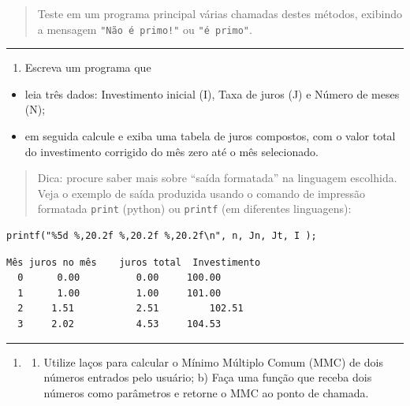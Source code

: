 \documentclass[12pt,a4paper]{article}
\renewcommand{\linethickness}{0.05em}
\providecommand{\tightlist}{%
      \setlength{\itemsep}{0pt}\setlength{\parskip}{0pt}}
\begin{document}
\begin{quote}
Teste em um programa principal várias chamadas destes métodos, exibindo
a mensagem \texttt{"Não\ é\ primo!"} ou \texttt{"é\ primo"}.
\end{quote}

    \begin{center}\rule{0.5\linewidth}{\linethickness}\end{center}

\begin{enumerate}
\def\labelenumi{\arabic{enumi}.}
\setcounter{enumi}{3}
\tightlist
\item
  Escreva um programa que
\end{enumerate}

\begin{itemize}
\tightlist
\item
  leia três dados: Investimento inicial (I), Taxa de juros (J) e Número
  de meses (N);
\item
  em seguida calcule e exiba uma tabela de juros compostos, com o valor
  total do investimento corrigido do mês zero até o mês selecionado.
\end{itemize}

\begin{quote}
Dica: procure saber mais sobre ``saída formatada'' na linguagem
escolhida. Veja o exemplo de saída produzida usando o comando de
impressão formatada \texttt{print} (python) ou \texttt{printf} (em
diferentes linguagens):
\end{quote}

    \begin{verbatim}
printf("%5d %,20.2f %,20.2f %,20.2f\n", n, Jn, Jt, I );
\end{verbatim}

    \begin{verbatim}
Mês juros no mês    juros total  Investimento
  0      0.00          0.00     100.00
  1      1.00          1.00     101.00
  2     1.51           2.51         102.51
  3     2.02           4.53     104.53
\end{verbatim}

    \begin{center}\rule{0.5\linewidth}{\linethickness}\end{center}

\begin{enumerate}
\def\labelenumi{\arabic{enumi}.}
\setcounter{enumi}{4}
\item
  \begin{enumerate}
  \def\labelenumii{\alph{enumii})}
  \tightlist
  \item
    Utilize laços para calcular o Mínimo Múltiplo Comum (MMC) de dois
    números entrados pelo usuário; b) Faça uma função que receba dois
    números como parâmetros e retorne o MMC ao ponto de chamada.
  \end{enumerate}
\end{enumerate}
\end{document}
